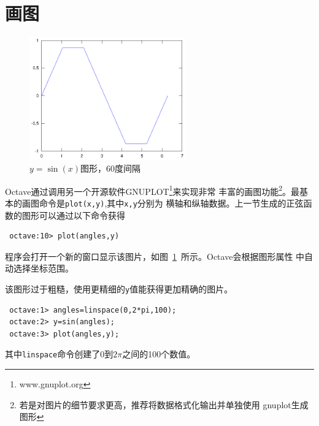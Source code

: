 \documentclass[UTF8,adobefonts]{ctexart}
\begin{document}
\section{画图}
\begin{figure}[htbp]
\centering
\includegraphics[width=0.6\textwidth]{sinx.eps}
\caption{$y=\sin(x)$图形，60度间隔}
\label{sin1}
\end{figure}
Octave通过调用另一个开源软件GNUPLOT\footnote{www.gnuplot.org}来实现非常
丰富的画图功能\footnote{若是对图片的细节要求更高，推荐将数据格式化输出并单独使用
gnuplot生成图形}。最基本的画图命令是{\tt plot(x,y)},其中{\tt x,y}分别为
横轴和纵轴数据。上一节生成的正弦函数的图形可以通过以下命令获得
\begin{verbatim}
 octave:10> plot(angles,y)
\end{verbatim}
程序会打开一个新的窗口显示该图片，如图~\ref{sin1}~所示。Octave会根据图形属性
中自动选择坐标范围。

该图形过于粗糙，使用更精细的{\tt y}值能获得更加精确的图片。
\begin{verbatim}
 octave:1> angles=linspace(0,2*pi,100);
 octave:2> y=sin(angles);
 octave:3> plot(angles,y);
\end{verbatim}
其中{\tt linspace}命令创建了0到$2\pi$之间的100个数值。
\end{document}
